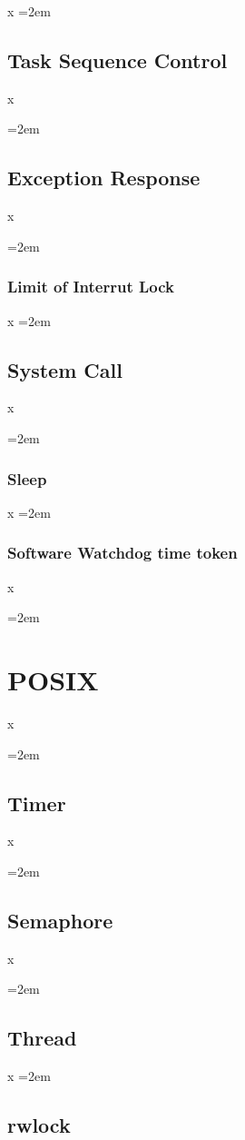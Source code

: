 \documentclass[a4paper]{article}
\let\oldsection\section
\renewcommand{\section}{\leftskip=2em \oldsection}
\let\oldsubsection\subsection
\renewcommand{\subsection}{\leftskip=2em \oldsubsection}
\let\oldsubsubsection\subsubsection
\renewcommand{\subsubsection}{\leftskip=2em \oldsubsubsection}
\begin{document}
x
\subsection{Task Sequence Control}
x

\subsection{Exception Response}
x


\subsubsection{Limit of Interrut Lock}

x
\subsection{System Call}
x

\subsubsection{Sleep}

x
\subsubsection{Software Watchdog time token}

x

\newpage
\section{POSIX}
x


\subsection{Timer}
x

\subsection{Semaphore}
x

\subsection{Thread}

x
\subsection{rwlock}
\end{document}
